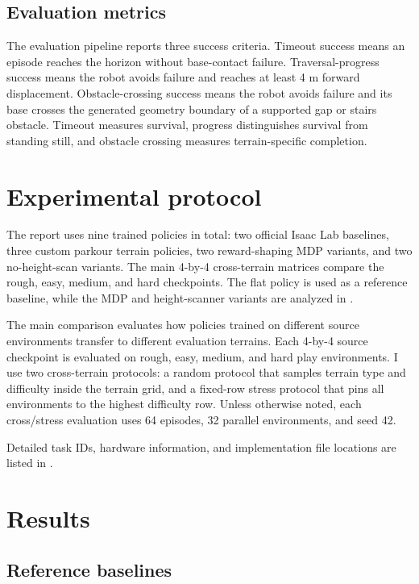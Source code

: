 \documentclass{article}
\begin{document}
\subsection{Evaluation metrics}

The evaluation pipeline reports three success criteria. Timeout success means an episode reaches the horizon without base-contact failure. Traversal-progress success means the robot avoids failure and reaches at least 4 m forward displacement. Obstacle-crossing success means the robot avoids failure and its base crosses the generated geometry boundary of a supported gap or stairs obstacle. Timeout measures survival, progress distinguishes survival from standing still, and obstacle crossing measures terrain-specific completion.

\section{Experimental protocol}
\label{sec:setup}

The report uses nine trained policies in total: two official Isaac Lab baselines, three custom parkour terrain policies, two reward-shaping MDP variants, and two no-height-scan variants. The main 4-by-4 cross-terrain matrices compare the rough, easy, medium, and hard checkpoints. The flat policy is used as a reference baseline, while the MDP and height-scanner variants are analyzed in .

The main comparison evaluates how policies trained on different source environments transfer to different evaluation terrains. Each 4-by-4 source checkpoint is evaluated on rough, easy, medium, and hard play environments. I use two cross-terrain protocols: a random protocol that samples terrain type and difficulty inside the terrain grid, and a fixed-row stress protocol that pins all environments to the highest difficulty row. Unless otherwise noted, each cross/stress evaluation uses 64 episodes, 32 parallel environments, and seed 42.

Detailed task IDs, hardware information, and implementation file locations are listed in .

\section{Results}
\label{sec:results}

\subsection{Reference baselines}
\end{document}
